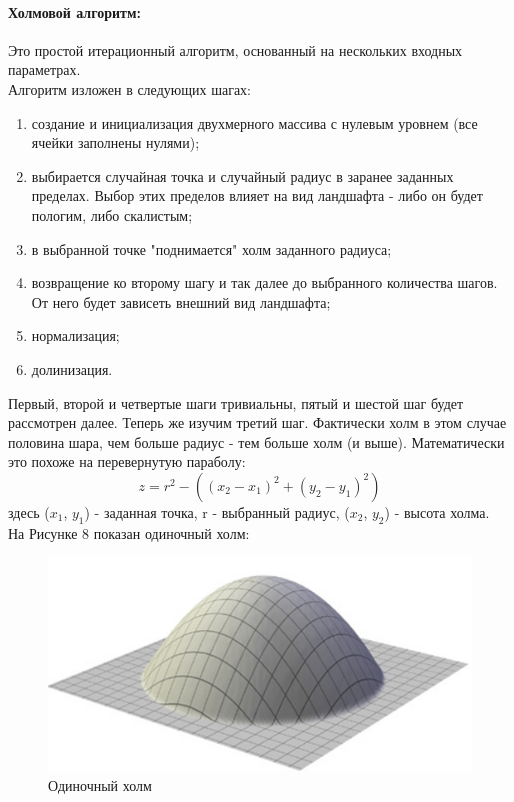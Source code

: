 \documentclass[a4paper, 10pt]{article}
\begin{document}
	\paragraph{Холмовой алгоритм:}
	Это простой итерационный алгоритм, основанный на нескольких входных параметрах.\cite{ixbt} 
	\\ Алгоритм изложен в следующих шагах:
	\begin{enumerate}
		\item создание и инициализация двухмерного массива с нулевым уровнем (все ячейки заполнены нулями);
		\item выбирается случайная точка и случайный радиус в заранее заданных пределах. Выбор этих пределов влияет на вид ландшафта - либо он будет пологим, либо скалистым;
		\item в выбранной точке "поднимается" холм заданного радиуса;
		\item возвращение ко второму шагу и так далее до выбранного количества шагов. От него будет зависеть внешний вид ландшафта;
		\item нормализация;
		\item долинизация.
	\end{enumerate}
	\hspace*{5mm} Первый, второй и четвертые шаги тривиальны, пятый и шестой шаг будет рассмотрен далее. Теперь же изучим третий шаг. Фактически холм  в этом случае половина шара, чем больше радиус - тем больше холм (и выше). Математически это похоже на перевернутую параболу:
	\begin{equation}
		z = r^2 - ((x_2 - x_1)^2 + (y_2 - y_1)^2)
	\end{equation}
	здесь ($x_1$, $y_1$) - заданная точка, r - выбранный радиус, ($x_2$, $y_2$) - высота холма.
	\\На Рисунке 8 показан одиночный холм:
	\begin{figure}[h!]
		\centering
		\includegraphics[scale=0.8]{holm}
		\centering\caption{Одиночный холм}
	\end{figure}
\end{document}
